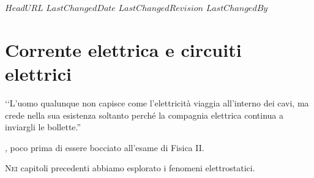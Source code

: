 \svnidlong
{$HeadURL$}
{$LastChangedDate$}
{$LastChangedRevision$}
{$LastChangedBy$}

\chapter{Corrente elettrica e circuiti elettrici}

\begin{introduction}
	‘‘L’uomo qualunque non capisce come l’elettricità viaggia all’interno dei cavi, ma crede nella sua esistenza soltanto perché la compagnia elettrica continua a inviargli le bollette.''
	\begin{flushright}
		, poco prima di essere bocciato all'esame di Fisica II.
	\end{flushright}
\end{introduction} %
\lettrine[findent=1pt, nindent=0pt]{N}{ei} capitoli precedenti abbiamo esplorato i fenomeni elettrostatici. 
